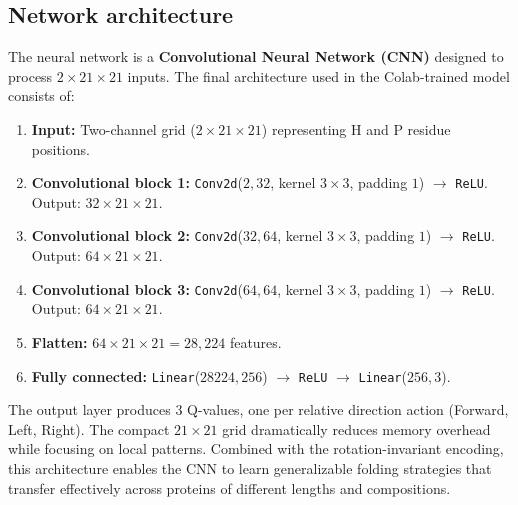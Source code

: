 \subsection{Network architecture}
\label{cap2:subsec_cnn}

The neural network is a \textbf{Convolutional Neural Network (CNN)} designed to process $2 \times 21 \times 21$ inputs. The final architecture used in the Colab-trained model consists of:

\begin{enumerate}
    \item \textbf{Input:} Two-channel grid ($2 \times 21 \times 21$) representing H and P residue positions.
    \item \textbf{Convolutional block 1:} \texttt{Conv2d}($2, 32$, kernel $3\times3$, padding $1$) $\rightarrow$ \texttt{ReLU}. Output: $32 \times 21 \times 21$.
    \item \textbf{Convolutional block 2:} \texttt{Conv2d}($32, 64$, kernel $3\times3$, padding $1$) $\rightarrow$ \texttt{ReLU}. Output: $64 \times 21 \times 21$.
    \item \textbf{Convolutional block 3:} \texttt{Conv2d}($64, 64$, kernel $3\times3$, padding $1$) $\rightarrow$ \texttt{ReLU}. Output: $64 \times 21 \times 21$.
    \item \textbf{Flatten:} $64 \times 21 \times 21 = 28{,}224$ features.
    \item \textbf{Fully connected:} \texttt{Linear}($28224, 256$) $\rightarrow$ \texttt{ReLU} $\rightarrow$ \texttt{Linear}($256, 3$).
\end{enumerate}

The output layer produces 3 Q-values, one per relative direction action (Forward, Left, Right). The compact $21 \times 21$ grid dramatically reduces memory overhead while focusing on local patterns. Combined with the rotation-invariant encoding, this architecture enables the CNN to learn generalizable folding strategies that transfer effectively across proteins of different lengths and compositions.

